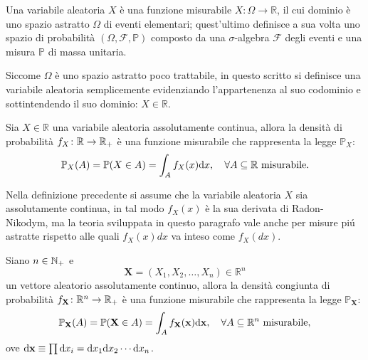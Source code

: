     \begin{dfn}
      \label{defVariabileAleatoria}
      Una variabile aleatoria \(X\) è una funzione misurabile \(X\colon\Omega\to\mathbb R\), il cui dominio è uno spazio astratto \(\Omega\) di eventi elementari; quest'ultimo definisce a sua volta uno spazio di probabilità \((\Omega,\mathcal F,\mathbb P)\) composto da una \(\sigma\)-algebra \(\mathcal F\) degli eventi e una misura \(\mathbb P\) di massa unitaria.

      Siccome \(\Omega\) è uno spazio astratto poco trattabile, in questo scritto si definisce una variabile aleatoria semplicemente evidenziando l'appartenenza al suo codominio e sottintendendo il suo dominio: \(X\in\mathbb R\).
    \end{dfn}

    \begin{dfn}
      \label{defDensitàProbabilità}
      Sia \(X\in\mathbb R\) una variabile aleatoria assolutamente continua, allora la densità di probabilità \(f_X\colon\mathbb R\to\mathbb R_+\) è una funzione misurabile che rappresenta la legge \(\mathbb P_X\):
      \[
        \mathbb P_X(A)=\mathbb P(X\in A)=\int_Af_X(x)\mathrm{d} x,
        \quad\forall A\subseteq\mathbb R\text{ misurabile}.
      \]
    \end{dfn}

    \begin{oss}
      Nella definizione precedente si assume che la variabile aleatoria \(X\) sia assolutamente continua, in tal modo \(f_X(x)\) è la sua derivata di Radon-Nikodym, ma la teoria sviluppata in questo paragrafo vale anche per misure piú astratte rispetto alle quali \(f_X(x)dx\) va inteso come \(f_X(dx)\).
    \end{oss}

    \begin{dfn}
      \label{defDensitàCongiuntaProbabilità}
      Siano \(n\in\mathbb N_+\) e \[\mathbf X=(X_1,X_2,\ldots,X_n)\in\mathbb R^n\] un vettore aleatorio assolutamente continuo, allora la densità congiunta di probabilità \(f_{\mathbf X}\colon\mathbb R^n\to\mathbb R_+\) è una funzione misurabile che rappresenta la legge \(\mathbb P_{\mathbf X}\):
      \[
        \mathbb P_{\mathbf X}(A)=\mathbb P(\mathbf X\in A)
        =\int_Af_{\mathbf X}(\mathbf x)\mathrm{d}\mathbf x,
        \quad\forall A\subseteq\mathbb R^n\text{ misurabile},
      \]
      ove \(\mathrm{d}\mathbf x\equiv\prod\mathrm{d} x_i=\mathrm{d} x_1\mathrm{d} x_2\cdots\mathrm{d} x_n\).
    \end{dfn}
    
